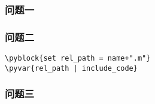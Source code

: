\subsubsection{问题一}
\subsubsection{问题二}
\textit{}
\begin{lstlisting}[frame=single]
\pyblock{set rel_path = name+".m"}
\pyvar{rel_path | include_code}
\end{lstlisting}
\subsubsection{问题三}